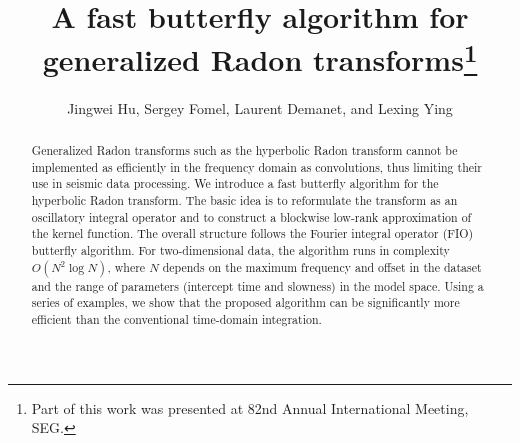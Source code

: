 
\title{A fast butterfly algorithm for generalized Radon transforms\footnote{Part of this work was presented at 82nd Annual International Meeting, SEG.}}
\author{Jingwei Hu\footnotemark[1], Sergey Fomel\footnotemark[2], Laurent Demanet\footnotemark[3], and Lexing Ying\footnotemark[4]} 

\address{
\footnotemark[1]Institute for Computational Engineering and Sciences (ICES)\\
The University of Texas at Austin\\
201 East 24th St, Stop C0200, Austin, TX 78712, USA\\
hu@ices.utexas.edu\\
\footnotemark[2]Bureau of Economic Geology and Department of Geological Sciences\\
Jackson School of Geosciences\\
The University of Texas at Austin\\
University Station, Box X, Austin, TX 78713, USA\\
sergey.fomel@beg.utexas.edu\\
\footnotemark[3]Department of Mathematics\\
Massachusetts Institute of Technology\\
77 Massachusetts Avenue, Cambridge, MA 02139, USA\\
laurent@math.mit.edu\\
\footnotemark[4]Department of Mathematics and\\
Institute for Computational and Mathematical Engineering (ICME)\\
Stanford University\\
450 Serra Mall, Bldg 380, Stanford, CA 94305, USA\\
lexing@math.stanford.edu
}



\maketitle

\begin{abstract}
Generalized Radon transforms such as the hyperbolic Radon transform cannot be implemented as efficiently in the frequency domain as convolutions, thus limiting their use in seismic data processing. We introduce a fast butterfly algorithm for the hyperbolic Radon transform. The basic idea is to reformulate the transform as an oscillatory integral operator and to construct a blockwise low-rank approximation of the kernel function. The overall structure follows the Fourier integral operator (FIO) butterfly algorithm. For two-dimensional data, the algorithm runs in complexity $O(N^2\log N)$, where $N$ depends on the maximum frequency and offset in the dataset and the range of parameters (intercept time and slowness) in the model space. Using a series of examples, we show that the proposed algorithm can be significantly more efficient than the conventional time-domain integration.
\end{abstract}


